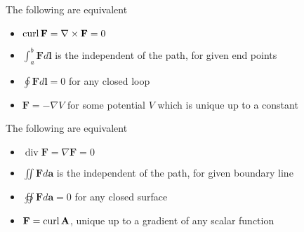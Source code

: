 \documentclass[main]{subfiles}
\begin{document}
\begin{theorem}
The following are equivalent
\begin{itemize}
\item $\operatorname{curl}\mathbf F=\nabla\times \mathbf F=0$
\item $\displaystyle\int_a^b\mathbf Fd\mathbf l$ is the independent of the path, for given end points
\item $\displaystyle\oint\mathbf Fd\mathbf l=0$ for any closed loop
\item $\mathbf F=-\nabla V$ for some potential $V$ which is unique up to a constant
\end{itemize}
\end{theorem}

\begin{theorem}
The following are equivalent
\begin{itemize}
\item $\operatorname{div}\mathbf F=\nabla\mathbf F=0$
\item $\displaystyle\iint\mathbf Fd\mathbf a$ is the independent of the path, for given boundary line
\item $\displaystyle\oiint\mathbf Fd\mathbf a=0$ for any closed surface
\item $\mathbf F=\operatorname{curl}\mathbf A$, unique up to a gradient of any scalar function
\end{itemize}
\end{theorem}

\begin{theorem}

\end{theorem}

\begin{theorem}

\end{theorem}
\end{document}
